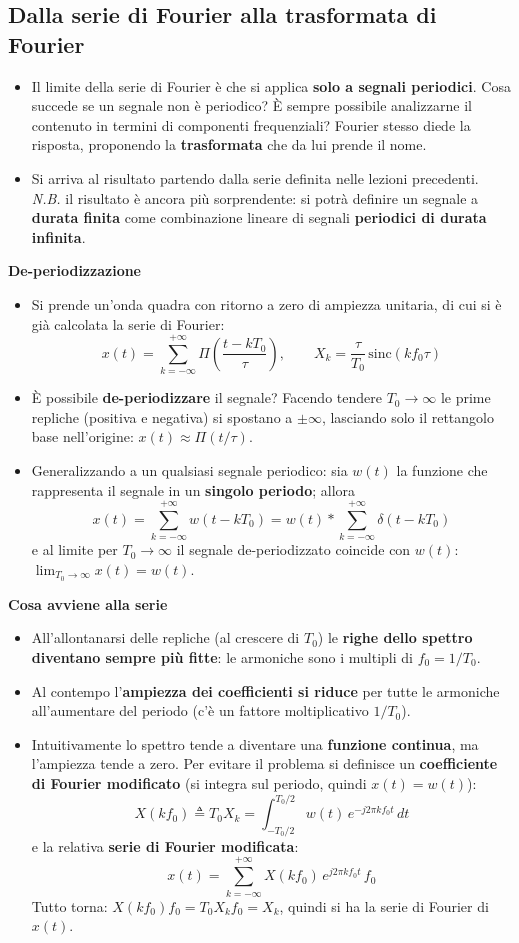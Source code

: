 \documentclass[12pt, a4paper]{article}
\begin{document}
\subsection{Dalla serie di Fourier alla trasformata di Fourier}
\begin{itemize}
    \item Il limite della serie di Fourier è che si applica \textbf{solo a segnali periodici}. Cosa succede se un segnale non è periodico? È sempre possibile analizzarne il contenuto in termini di componenti frequenziali? Fourier stesso diede la risposta, proponendo la \textbf{trasformata} che da lui prende il nome.
    \item Si arriva al risultato partendo dalla serie definita nelle lezioni precedenti. \textit{N.B.} il risultato è ancora più sorprendente: si potrà definire un segnale a \textbf{durata finita} come combinazione lineare di segnali \textbf{periodici di durata infinita}.
\end{itemize}

\textbf{De-periodizzazione}
\begin{itemize}
    \item Si prende un'onda quadra con ritorno a zero di ampiezza unitaria, di cui si è già calcolata la serie di Fourier:
    $$x(t)=\sum_{k=-\infty}^{+\infty}\Pi\!\left(\frac{t-kT_0}{\tau}\right), \qquad X_k=\frac{\tau}{T_0}\,\text{sinc}(kf_0\tau)$$
    \item È possibile \textbf{de-periodizzare} il segnale? Facendo tendere $T_0\to\infty$ le prime repliche (positiva e negativa) si spostano a $\pm\infty$, lasciando solo il rettangolo base nell'origine: $x(t)\approx\Pi(t/\tau)$.
    \item Generalizzando a un qualsiasi segnale periodico: sia $w(t)$ la funzione che rappresenta il segnale in un \textbf{singolo periodo}; allora
    $$x(t)=\sum_{k=-\infty}^{+\infty}w(t-kT_0)=w(t)*\sum_{k=-\infty}^{+\infty}\delta(t-kT_0)$$
    e al limite per $T_0\to\infty$ il segnale de-periodizzato coincide con $w(t)$: $\displaystyle\lim_{T_0\to\infty}x(t)=w(t)$.
\end{itemize}

\textbf{Cosa avviene alla serie}
\begin{itemize}
    \item All'allontanarsi delle repliche (al crescere di $T_0$) le \textbf{righe dello spettro diventano sempre più fitte}: le armoniche sono i multipli di $f_0=1/T_0$.
    \item Al contempo l'\textbf{ampiezza dei coefficienti si riduce} per tutte le armoniche all'aumentare del periodo (c'è un fattore moltiplicativo $1/T_0$).
    \item Intuitivamente lo spettro tende a diventare una \textbf{funzione continua}, ma l'ampiezza tende a zero. Per evitare il problema si definisce un \textbf{coefficiente di Fourier modificato} (si integra sul periodo, quindi $x(t)=w(t)$):
    $$X(kf_0)\triangleq T_0X_k=\int_{-T_0/2}^{T_0/2}w(t)\,e^{-j2\pi kf_0t}\,dt$$
    e la relativa \textbf{serie di Fourier modificata}:
    $$x(t)=\sum_{k=-\infty}^{+\infty}X(kf_0)\,e^{j2\pi kf_0t}\,f_0$$
    Tutto torna: $X(kf_0)f_0=T_0X_kf_0=X_k$, quindi si ha la serie di Fourier di $x(t)$.
\end{itemize}
\end{document}
